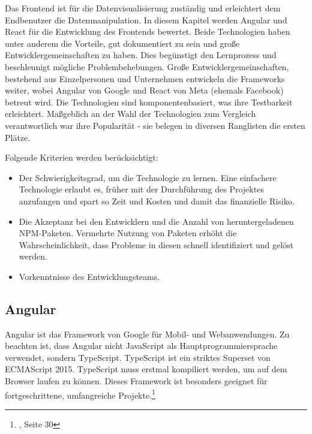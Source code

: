 Das Frontend ist für die Datenvisualisierung zuständig und erleichtert dem Endbenutzer die Datenmanipulation. In diesem Kapitel werden Angular und React für die Entwicklung des Frontends bewertet. Beide Technologien haben unter anderem die Vorteile, gut dokumentiert zu sein und große Entwicklergemeinschaften zu haben\cite{SO01}. Dies begünstigt den Lernprozess und beschleunigt mögliche Problembehebungen. Große Entwicklergemeinschaften, bestehend aus Einzelpersonen und Unternehmen entwickeln die Frameworks weiter, wobei Angular von Google und React von Meta (ehemals Facebook) betreut wird. Die Technologien sind komponentenbasiert, was ihre Testbarkeit erleichtert. Maßgeblich an der Wahl der Technologien zum Vergleich verantwortlich war ihre Popularität - sie belegen in diversen Ranglisten die ersten Plätze\cite{SO01}.

Folgende Kriterien werden berücksichtigt:
\begin{itemize}
  \item
        Der Schwierigkeitsgrad, um die Technologie zu lernen. Eine einfachere Technologie erlaubt es, früher mit der Durchführung des Projektes anzufangen und spart so Zeit und Kosten und damit das finanzielle Risiko.
  \item
        Die Akzeptanz bei den Entwicklern und die Anzahl von heruntergeladenen NPM-Paketen. Vermehrte Nutzung von Paketen erhöht die Wahrscheinlichkeit, dass Probleme in diesen schnell identifiziert und gelöst werden\cite{LIN1}.
  \item
        Vorkenntnisse des Entwicklungsteams.

\end{itemize}

\subsection*{Angular}
Angular ist das Framework von Google für Mobil- und Webanwendungen.
Zu beachten ist, dass Angular nicht JavaScript als Hauptprogrammiersprache verwendet, sondern TypeScript.
TypeScript ist ein striktes Superset von ECMAScript 2015.
TypeScript muss erstmal kompiliert werden, um auf dem Browser laufen zu können{\cite{MS1}}. Dieses Framework ist besonders geeignet für fortgeschrittene, umfangreiche Projekte.\footnote{{\cite{AN1}}, Seite 30}

